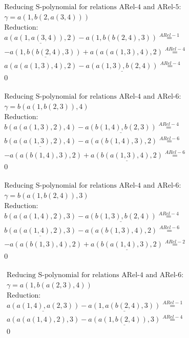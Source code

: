 \documentclass[11pt]{amsart}
\begin{document}
\begin{align*} 
& \text{Reducing S-polynomial for relations ARel-4 and ARel-5:} \\ 
& \gamma = a(1,b(2,a(3,4))) \\ 
& \text{Reduction}: \\&\underline{a(a(1,a(3,4)),2)} - a(1,b(b(2,4),3)) \stackrel{ ARel-1 }{=}  \\ 
& - \underline{a(1,b(b(2,4),3))} + a(a(a(1,3),4),2) \stackrel{ ARel-4 }{=}  \\ 
&a(a(a(1,3),4),2) - \underline{a(a(1,3),b(2,4))} \stackrel{ ARel-4 }{=}  \\ 
&0\\ 
\end{align*} 
 
\begin{align*} 
& \text{Reducing S-polynomial for relations ARel-4 and ARel-6:} \\ 
& \gamma = b(a(1,b(2,3)),4) \\ 
& \text{Reduction}: \\&b(a(a(1,3),2),4) - \underline{a(b(1,4),b(2,3))} \stackrel{ ARel-4 }{=}  \\ 
&\underline{b(a(a(1,3),2),4)} - a(a(b(1,4),3),2) \stackrel{ ARel-6 }{=}  \\ 
& - a(a(b(1,4),3),2) + \underline{a(b(a(1,3),4),2)} \stackrel{ ARel-6 }{=}  \\ 
&0\\ 
\end{align*} 
 
\begin{align*} 
& \text{Reducing S-polynomial for relations ARel-4 and ARel-6:} \\ 
& \gamma = b(a(1,b(2,4)),3) \\ 
& \text{Reduction}: \\&b(a(a(1,4),2),3) - \underline{a(b(1,3),b(2,4))} \stackrel{ ARel-4 }{=}  \\ 
&\underline{b(a(a(1,4),2),3)} - a(a(b(1,3),4),2) \stackrel{ ARel-6 }{=}  \\ 
& - a(a(b(1,3),4),2) + \underline{a(b(a(1,4),3),2)} \stackrel{ ARel-2 }{=}  \\ 
&0\\ 
\end{align*} 
 
\begin{align*} 
& \text{Reducing S-polynomial for relations ARel-4 and ARel-6:} \\ 
& \gamma = a(1,b(a(2,3),4)) \\ 
& \text{Reduction}: \\&\underline{a(a(1,4),a(2,3))} - \underline{a(1,a(b(2,4),3))} \stackrel{ ARel-1 }{=}  \\ 
&a(a(a(1,4),2),3) - \underline{a(a(1,b(2,4)),3)} \stackrel{ ARel-4 }{=}  \\ 
&0\\ 
\end{align*} 
 
\end{document}
